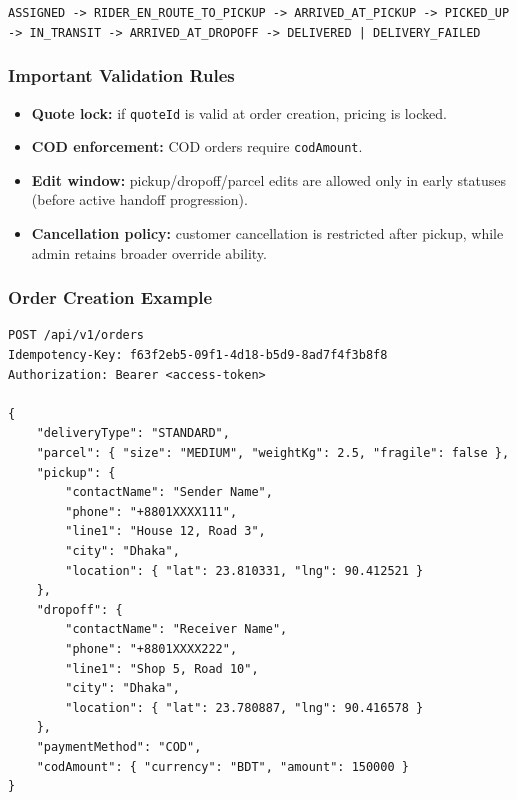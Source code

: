 \begin{tcolorbox}[
		enhanced,
		colback=SuccessGreen!7,
		colframe=SuccessGreen,
		arc=4pt,
		boxrule=0.8pt,
		left=10pt, right=10pt, top=7pt, bottom=7pt,
		title={\bfseries Rider State Machine (Operational Flow)},
		fonttitle=\bfseries\color{white},
		colbacktitle=SuccessGreen
]
\texttt{ASSIGNED -> RIDER\_EN\_ROUTE\_TO\_PICKUP -> ARRIVED\_AT\_PICKUP -> PICKED\_UP}\newline
\texttt{-> IN\_TRANSIT -> ARRIVED\_AT\_DROPOFF -> DELIVERED | DELIVERY\_FAILED}
\end{tcolorbox}

\subsubsection{Important Validation Rules}

\begin{itemize}
		\item \textbf{Quote lock:} if \texttt{quoteId} is valid at order creation,
					pricing is locked.
		\item \textbf{COD enforcement:} COD orders require \texttt{codAmount}.
		\item \textbf{Edit window:} pickup/dropoff/parcel edits are allowed only in
					early statuses (before active handoff progression).
		\item \textbf{Cancellation policy:} customer cancellation is restricted after pickup,
					while admin retains broader override ability.
\end{itemize}

\subsubsection{Order Creation Example}

\begin{lstlisting}[caption={Simplified order creation request}]
POST /api/v1/orders
Idempotency-Key: f63f2eb5-09f1-4d18-b5d9-8ad7f4f3b8f8
Authorization: Bearer <access-token>

{
	"deliveryType": "STANDARD",
	"parcel": { "size": "MEDIUM", "weightKg": 2.5, "fragile": false },
	"pickup": {
		"contactName": "Sender Name",
		"phone": "+8801XXXX111",
		"line1": "House 12, Road 3",
		"city": "Dhaka",
		"location": { "lat": 23.810331, "lng": 90.412521 }
	},
	"dropoff": {
		"contactName": "Receiver Name",
		"phone": "+8801XXXX222",
		"line1": "Shop 5, Road 10",
		"city": "Dhaka",
		"location": { "lat": 23.780887, "lng": 90.416578 }
	},
	"paymentMethod": "COD",
	"codAmount": { "currency": "BDT", "amount": 150000 }
}
\end{lstlisting}

